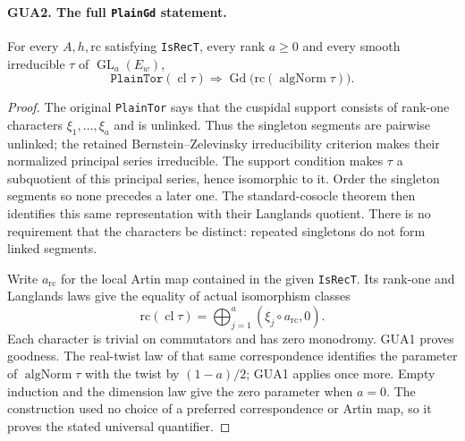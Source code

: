\paragraph{GUA2. The full \texttt{PlainGd} statement.}
\label{claim:GUA2}
For every $A,h,\mathrm{rc}$ satisfying \texttt{IsRecT}, every
rank $a\geq0$ and every smooth irreducible $\tau$ of
$\operatorname{GL}_a(E_w)$,
\[
 \texttt{PlainTor}(\operatorname{cl}\tau)
            \Longrightarrow
       \operatorname{Gd}\bigl(\mathrm{rc}(\operatorname{algNorm}\tau)\bigr).
                                                        \tag{GUA.5}
\]
\begin{proof}
The original \texttt{PlainTor} says that the cuspidal support
consists of rank-one characters $\xi_1,\ldots,\xi_a$ and is
unlinked.  Thus the singleton segments are pairwise unlinked;
the retained Bernstein--Zelevinsky irreducibility criterion
makes their normalized principal series irreducible.  The
support condition makes $\tau$ a subquotient of this principal
series, hence isomorphic to it.  Order the singleton segments
so none precedes a later one.  The standard-cosocle theorem
then identifies this same representation with their Langlands
quotient.  There is no requirement that the characters be
distinct: repeated singletons do not form linked segments.

Write $a_{\mathrm{rc}}$ for the local Artin map contained in
the given \texttt{IsRecT}.  Its rank-one and Langlands laws
give the equality of actual isomorphism classes
\[
 \mathrm{rc}(\operatorname{cl}\tau)
       =\bigoplus_{j=1}^a (\xi_j\circ a_{\mathrm{rc}},0).
\]
Each character is trivial on commutators and has zero
monodromy.  GUA1 proves goodness.  The real-twist law of
that same correspondence identifies the parameter of
$\operatorname{algNorm}\tau$ with the twist by $(1-a)/2$;
GUA1 applies once more.  Empty induction and the dimension
law give the zero parameter when $a=0$.  The construction
used no choice of a preferred correspondence or Artin map,
so it proves the stated universal quantifier.
\end{proof}

